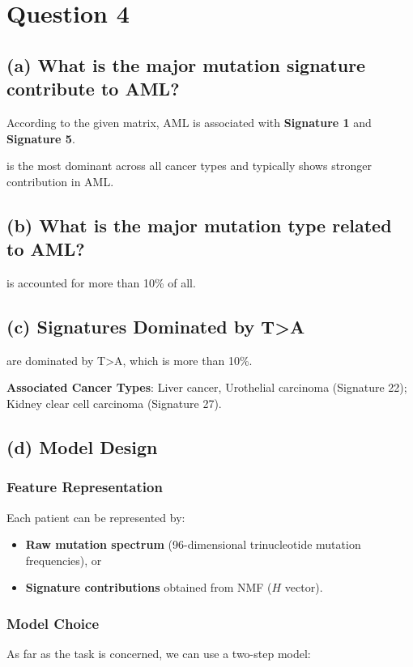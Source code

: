 \section*{Question 4}

\subsection*{(a) What is the major mutation signature contribute to AML?}

According to the given matrix, AML is associated with \textbf{Signature 1} and \textbf{Signature 5}.

 is the most dominant across all cancer types and typically shows stronger contribution in AML.

\subsection*{(b) What is the major mutation type related to AML?}

 is accounted for more than 10\% of all.

\subsection*{(c) Signatures Dominated by T>A}

 are dominated by T>A, which is more than 10\%.

\textbf{Associated Cancer Types}: Liver cancer, Urothelial carcinoma (Signature 22); Kidney clear cell carcinoma (Signature 27).

\subsection*{(d) Model Design}

\subsubsection*{Feature Representation}
Each patient can be represented by:
\begin{itemize}
    \item \textbf{Raw mutation spectrum} (96-dimensional trinucleotide mutation frequencies), or
    \item \textbf{Signature contributions} obtained from NMF ($H$ vector).
\end{itemize}

\subsubsection*{Model Choice}
As far as the task is concerned, we can use a two-step model:

